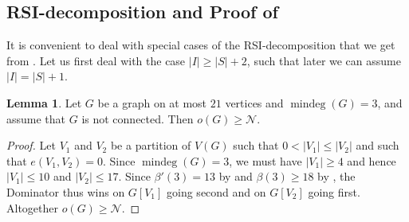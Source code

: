 \documentclass[a4paper,11pt,oneside]{scrartcl}
\theoremstyle{definition}
\newtheorem{lemma}[definition]{Lemma}
\theoremstyle{remark}
\DeclareMathOperator{\mindeg}{mindeg}
\begin{document}
\subsection*{RSI-decomposition and Proof of }
It is convenient to deal with special cases of the RSI-decomposition that we get from . Let us first deal with the case $|I| \geq |S|+2$, such that later we can assume $|I| = |S|+1$.

\begin{lemma}\label{lemma:beta_3_disconnected}
    Let $G$ be a graph on at most $21$ vertices and $\mindeg(G) = 3$, and assume that $G$ is not connected. Then $o(G) \geq \mathcal N$.
\end{lemma}
\begin{proof}
    Let $V_1$ and $V_2$ be a partition of $V(G)$ such that $0 < |V_1| \leq |V_2|$ and such that $e(V_1,V_2) = 0$. Since $\mindeg(G) = 3$, we must have $|V_1|\geq 4$ and hence $|V_1| \leq 10$ and $|V_2| \leq 17$. Since $\beta'(3) = 13$ by  and $\beta(3) \geq 18$ by , the Dominator thus wins on $G[V_1]$ going second and on $G[V_2]$ going first. Altogether $o(G) \geq \mathcal N$.
\end{proof}
\end{document}
